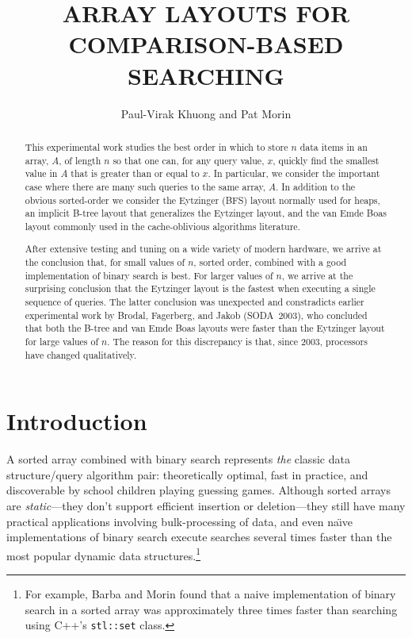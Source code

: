 \documentclass{patmorin}
\title{\MakeUppercase{Array Layouts for Comparison-Based Searching}}
\author{Paul-Virak Khuong and Pat Morin}
\begin{document}
\begin{titlepage}
\maketitle

\begin{abstract}
  This experimental work studies the best order in which to store $n$
  data items in an array, $A$, of length $n$ so that one can, for any
  query value, $x$, quickly find the smallest value in $A$ that is greater
  than or equal to $x$. In particular, we consider the important case
  where there are many such queries to the same array, $A$.  In addition
  to the obvious sorted-order we consider the Eytzinger (BFS) layout
  normally used for heaps, an implicit B-tree layout that generalizes
  the Eytzinger layout, and the van Emde Boas layout commonly used in
  the cache-oblivious algorithms literature.

  After extensive testing and tuning on a wide variety of modern hardware,
  we arrive at the conclusion that, for small values of $n$, sorted
  order, combined with a good implementation of binary search is best.
  For larger values of $n$, we arrive at the surprising conclusion that
  the Eytzinger layout is the fastest when executing a single sequence
  of queries.  The latter conclusion was unexpected and constradicts
  earlier experimental work by Brodal, Fagerberg, and Jakob (SODA~2003),
  who concluded that both the B-tree and van Emde Boas layouts were faster
  than the Eytzinger layout for large values of $n$.  The reason for this
  discrepancy is that, since 2003, processors have changed qualitatively.
\end{abstract}

\end{titlepage}

\section{Introduction}

A sorted array combined with binary search represents \emph{the} classic
data structure/query algorithm pair: theoretically optimal, fast in
practice, and discoverable by school children playing guessing games.
Although sorted arrays are \emph{static}---they don't support efficient
insertion or deletion---they still have many practical applications
involving bulk-processing of data, and even na\"{\i}ve implementations
of binary search execute searches several times faster than the most
popular dynamic data structures.\footnote{For example, Barba and Morin
\cite{bmXX} found that a naive implementation of binary search in a
sorted array was approximately three times faster than searching using
C++'s \texttt{stl::set} class.}
\end{document}

